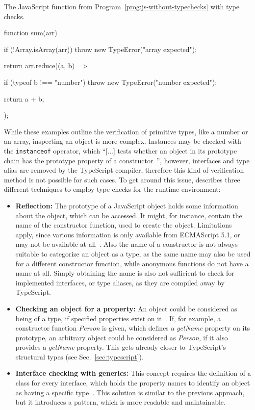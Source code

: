 \begin{program}
\caption{The JavaScript function from Program~\ref{prog:js-without-typechecks} with type checks.}
\label{prog:js-with-typechecks}
\begin{JsCode}
function sum(arr) {
  if (!Array.isArray(arr)) {
    throw new TypeError("array expected");
  }
  
  return arr.reduce((a, b) => {
    if (typeof b !== "number") {
      throw new TypeError("number expected");
    }
    
    return a + b;
  });
}
\end{JsCode}
\end{program}
While these examples outline the verification of primitive types, like a number or an array, inspecting an object is more complex. Instances may be checked with the \texttt{instanceof} operator, which ``[...] tests whether an object in its prototype chain has the prototype property of a constructor~\cite{instanceof:MDN:2017}'', however, interfaces and type alias are removed by the TypeScript compiler, therefore this kind of verification method is not possible for such cases. To get around this issue, \citeauthor{MasteringTypeScript:Rozentals:2015} describes three different techniques to employ type checks for the runtime environment:
\begin{itemize}
  \item \textbf{Reflection:} The prototype of a JavaScript object holds 
some information about the object, which can be accessed. It might, for instance, contain the name of the constructor function, used to create the object. Limitations apply, since various information is only available from ECMAScript 5.1, or may not be available at all~\cite[pp.~98--100]{MasteringTypeScript:Rozentals:2015}. Also the name of a constructor is not always suitable to categorize an object as a type, as the same name may also be used for a different constructor function, while anonymous functions do not have a name at all. Simply obtaining the name is also not sufficient to check for implemented interfaces, or type aliases, as they are compiled away by TypeScript.
  \item \textbf{Checking an object for a property:} An object could be considered 
as being of a type, if specified properties exist on it~\cites[pp.~101--102]{MasteringTypeScript:Rozentals:2015}[pp.~18--20]{ProJavaScriptDesignPatterns:HarmesDiaz:2008}. If, for example, a constructor function \emph{Person} is given, which defines a \emph{getName} property on its prototype, an arbitrary object could be considered as \emph{Person}, if it also provides a \emph{getName} property. This gets already closer to TypeScript's structural types (see Sec.~\ref{sec:typescript}).
  \item \textbf{Interface checking with generics:} This concept requires the definition of a class for every interface, which holds the property names to identify an object as having a specific type~\cites[pp.~102--105]{MasteringTypeScript:Rozentals:2015}[pp.~17--19]{ProJavaScriptDesignPatterns:HarmesDiaz:2008}. This solution is similar to the previous approach, but it introduces a pattern, which is more readable and maintainable.
\end{itemize}
